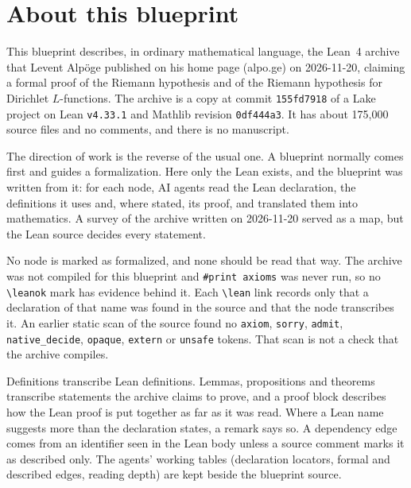 \chapter{About this blueprint}\label{ch:intro}

This blueprint describes, in ordinary mathematical language, the Lean~4
archive that Levent Alpöge published on his home page (alpo.ge) on
2026-11-20, claiming a formal proof of the Riemann hypothesis and of the
Riemann hypothesis for Dirichlet $L$-functions. The archive is a copy at
commit \texttt{155fd7918} of a Lake project on Lean \texttt{v4.33.1} and
Mathlib revision \texttt{0df444a3}. It has about 175{,}000 source files
and no comments, and there is no manuscript.

The direction of work is the reverse of the usual one. A blueprint
normally comes first and guides a formalization. Here only the Lean
exists, and the blueprint was written from it: for each node, AI agents
read the Lean declaration, the definitions it uses and, where stated,
its proof, and translated them into mathematics. A survey of the
archive written on 2026-11-20 served as a map, but the Lean source
decides every statement.

\begin{remark}\label{intro:status}
No node is marked as formalized, and none should be read that way.
The archive was not compiled for this blueprint and
\texttt{\#print axioms} was never run, so no \verb|\leanok| mark has
evidence behind it. Each \verb|\lean| link records only that a
declaration of that name was found in the source and that the node
transcribes it. An earlier static scan of the source found no
\texttt{axiom}, \texttt{sorry}, \texttt{admit}, \texttt{native\_decide},
\texttt{opaque}, \texttt{extern} or \texttt{unsafe} tokens. That scan
is not a check that the archive compiles.
\end{remark}

\begin{remark}\label{intro:reading}
Definitions transcribe Lean definitions. Lemmas, propositions and
theorems transcribe statements the archive claims to prove, and a proof
block describes how the Lean proof is put together as far as it was
read. Where a Lean name suggests more than the declaration states, a
remark says so. A dependency edge comes from an identifier seen in the
Lean body unless a source comment marks it as described only. The
agents' working tables (declaration locators, formal and described edges,
reading depth) are kept beside the blueprint source.
\end{remark}
